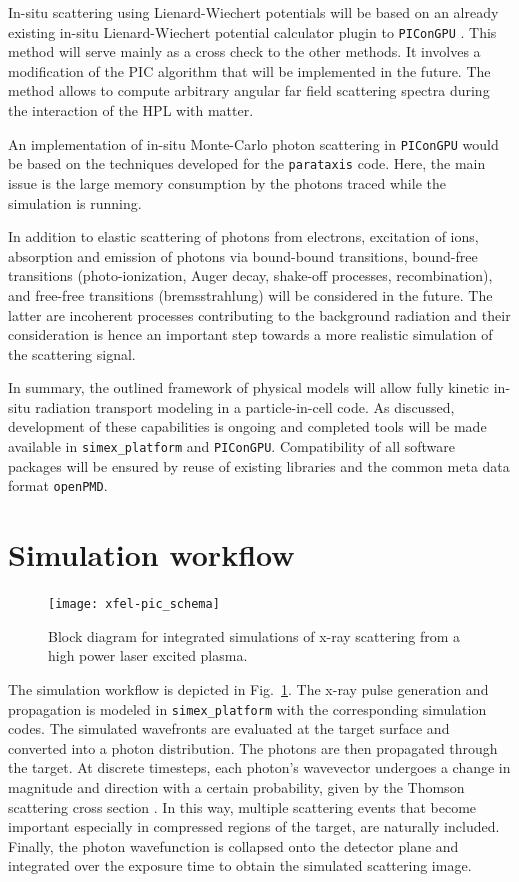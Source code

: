 \documentclass[12pt]{scrartcl}
\begin{document}
In-situ scattering using Lienard-Wiechert potentials will be based on an already
existing in-situ Lienard-Wiechert potential calculator plugin to
\texttt{PIConGPU} \cite{Pausch2013}. This method will serve mainly as a cross
check to the other methods. It involves a modification of the PIC algorithm that
will be implemented in the future. The method allows to compute arbitrary
angular far field scattering spectra during the interaction of the HPL with
matter.

An implementation of in-situ Monte-Carlo photon scattering in \texttt{PIConGPU}
would be based on the techniques developed for the \texttt{parataxis} code. Here, the
main issue is the large memory consumption by the photons traced while the
simulation is running.

In addition to elastic scattering of photons from electrons,
excitation of ions, absorption and emission of photons via bound-bound
transitions,
bound-free transitions (photo-ionization, Auger decay, shake-off processes, recombination),
and free-free transitions (bremsstrahlung) will be considered in
the future. The latter are incoherent processes contributing to the background
radiation and their consideration is hence an important step towards a more
realistic simulation of the scattering signal.

In summary, the outlined
framework of physical models will allow fully kinetic in-situ radiation
transport modeling in a particle-in-cell code.
As discussed, development of these capabilities is ongoing and completed tools
will be made available in \texttt{simex\_platform} and \texttt{PIConGPU}.
Compatibility of all software packages will be ensured by reuse of existing
libraries and the common meta data format \texttt{openPMD}.

\section{Simulation workflow}
%
\begin{figure}[ht]
  \begin{center}
    \texttt{[image: xfel-pic\_schema]}
  \end{center}
  \caption{Block diagram for integrated simulations of x-ray scattering from a high
  power laser excited plasma.}
  \label{fig:xfel-pic_schema}
\end{figure}

The simulation workflow is depicted in Fig.~\ref{fig:xfel-pic_schema}. The x-ray
pulse generation and propagation is modeled in \texttt{simex\_platform} with the
corresponding simulation codes. The simulated wavefronts are evaluated at the
target surface and converted into a photon distribution. The photons are then
propagated through the target. At discrete timesteps, each photon's wavevector
undergoes a change in magnitude and direction  with a
certain probability, given by the Thomson scattering cross section
\cite{Jackson1975}. In this way, multiple scattering events that become
important especially in compressed regions of the target, are naturally
included. Finally, the photon wavefunction is collapsed onto the detector plane
and integrated over the exposure time to obtain the simulated scattering image.
%
%
\end{document}
